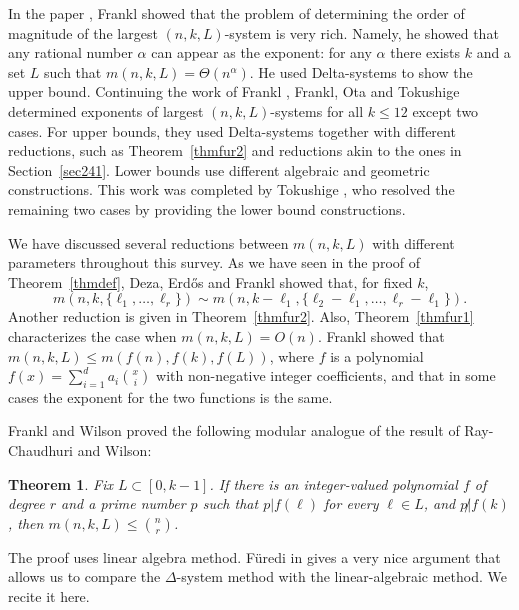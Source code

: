 \documentclass[graybox]{svmult}
\renewcommand{\le}{\leqslant}
\newtheorem{thm}{Theorem}
\begin{document}
In the paper \cite{Fra86}, Frankl showed that the problem of determining the order of magnitude of the largest $(n,k,L)$-system is very rich. Namely, he showed that any rational number $\alpha$ can appear as the exponent: for any $\alpha$ there exists $k$ and a set $L$ such that $m(n,k,L) = \Theta(n^{\alpha})$. He used Delta-systems to show the upper bound. Continuing the work of Frankl \cite{Fra80b}, Frankl, Ota and Tokushige \cite{FOT96} determined  exponents of largest $(n,k,L)$-systems for all $k\le 12$ except two cases. For upper bounds, they used Delta-systems together with different reductions, such as Theorem~\ref{thmfur2} and reductions akin to the ones in Section~\ref{sec241}. Lower bounds use different algebraic and geometric constructions. This work was completed by Tokushige \cite{Toku}, who resolved the remaining two cases by providing the lower bound constructions.

We have discussed several reductions between $m(n,k,L)$ with different parameters throughout this survey. As we have seen in the proof of Theorem~\ref{thmdef}, Deza, Erd\H os and Frankl \cite{DEF} showed that, for fixed $k$, $$m(n,k,\{\ell_1,\ldots, \ell_r\})\sim m(n,k-\ell_1,\{\ell_2-\ell_1,\ldots, \ell_r-\ell_1\}).$$ Another reduction is given in Theorem~\ref{thmfur2}. Also, Theorem~\ref{thmfur1} characterizes the case when $m(n,k,L) =O(n)$. Frankl \cite{Fra86} showed that $m(n,k,L)\le m(f(n),f(k),f(L))$, where $f$ is a polynomial $f(x) = \sum_{i=1}^d a_i{x\choose i}$ with non-negative integer coefficients, and that in some cases the exponent for the two functions is the same.

Frankl and Wilson \cite{FW} proved the following modular analogue of the result of Ray-Chaudhuri and Wilson:
\begin{thm}
  Fix $L\subset [0,k-1]$. If  there is an integer-valued polynomial  $f$ of degree $r$ and a prime number $p$ such that $p|f(\ell)$ for every $\ell\in L$, and $p\not | f(k)$, then $m(n,k,L)\le {n\choose r}$.
\end{thm}

The proof uses linear algebra method. F\"uredi in \cite{Fur91} gives a very nice argument that allows us to compare the  $\Delta$-system method with the linear-algebraic method. We recite it here.
\end{document}
